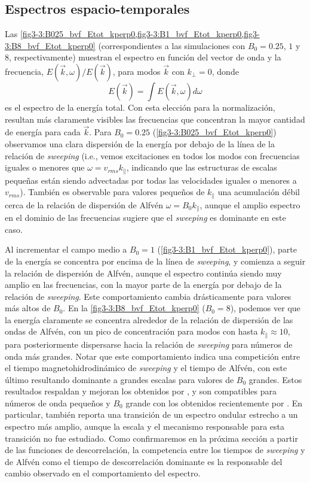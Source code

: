 \subsection{Espectros espacio-temporales}

Las \cref{fig3-3:B025_bvf_Etot_kperp0,fig3-3:B1_bvf_Etot_kperp0,fig3-3:B8_bvf_Etot_kperp0}
(correspondientes a las simulaciones con $B_0=0.25$, $1$ y $8$,
respectivamente) muestran el espectro en función del vector de onda y
la frecuencia, $E(\vec{k},\omega)/E(\vec{k})$, para modos $\vec{k}$
con $k_\perp = 0$, donde
\begin{equation}
  E(\vec{k})=\int E(\vec{k},\omega)d\omega
\end{equation}
es el espectro de la energía total. Con esta elección para la
normalización, resultan más claramente visibles las frecuencias que
concentran la mayor cantidad de energía para cada $\vec{k}$. Para
$B_0=0.25$ (\cref{fig3-3:B025_bvf_Etot_kperp0}) observamos una clara
dispersión de la energía por debajo de la línea de la relación de
\textit{sweeping} (i.e., vemos excitaciones en todos los modos con frecuencias
iguales o menores que $\omega = v_{rms} k_\parallel$, indicando que
las estructuras de escalas pequeñas están siendo advectadas por todas
las velocidades iguales o menores a $v_{rms}$).  También es observable
para valores pequeños de $k_\parallel$ una acumulación débil cerca de
la relación de dispersión de Alfvén $\omega = B_0 k_\parallel$, aunque
el amplio espectro en el dominio de las frecuencias sugiere que el
\textit{sweeping} es dominante en este caso.

Al incrementar el campo medio a $B_0=1$
(\cref{fig3-3:B1_bvf_Etot_kperp0}), parte de la energía se concentra
por encima de la línea de \textit{sweeping}, y comienza a seguir la
relación de dispersión de Alfvén, aunque el espectro continúa siendo
muy amplio en las frecuencias, con la mayor parte de la energía por
debajo de la relación de \textit{sweeping}.  Este comportamiento
cambia drásticamente para valores más altos de $B_0$.  En
la \cref{fig3-3:B8_bvf_Etot_kperp0} ($B_0=8$), podemos ver que la
energía claramente se concentra alrededor de la relación de dispersión
de las ondas de Alfvén, con un pico de concentración para modos con
hasta $k_\parallel \approx 10$, para posteriormente dispersarse hacia
la relación de \textit{sweeping} para números de onda más grandes.
Notar que este comportamiento indica una competición entre el tiempo
magnetohidrodinámico de \textit{sweeping} y el tiempo de Alfvén, con
este último resultando dominante a grandes escalas para valores de
$B_0$ grandes. Estos resultados respaldan y mejoran los obtenidos por
\cite{dmitruk_waves_2009}, y son compatibles para números de onda
pequeños y $B_0$ grande con los obtenidos recientemente por
\cite{meyrand_direct_2016, meyrand_weak_2015}. En particular, 
\cite{meyrand_direct_2016} también reporta una transición de un
espectro ondular estrecho a un espectro más amplio, aunque la escala y
el mecanismo responsable para esta transición no fue estudiado. Como
confirmaremos en la próxima sección a partir de las funciones de
descorrelación, la competencia entre los tiempos de \textit{sweeping}
y de Alfvén como el tiempo de descorrelación dominante es la
responsable del cambio observado en el comportamiento del espectro.

